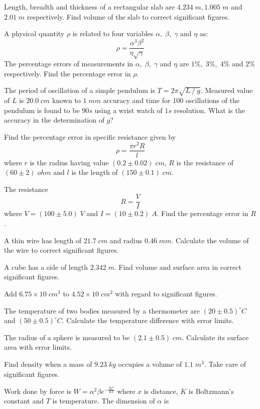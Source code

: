 \documentclass[10pt, a4paper]{exam}
\begin{document}
\begin{multicols*}{2}
\begin{questions}
        \question Length, breadth and thickness of a rectangular slab are $4.234 \; m, 1.005 \; m $ and $ 2.01 \; m$ respectively. Find volume of the slab to correct significant figures.
        
        \question A physical quantity $\rho$ is related to four variables $\alpha, \; \beta, \; \gamma$ and $\eta$ as: \[ \rho = \frac{\alpha^3\beta^2}{\eta\sqrt{\gamma}} \] The percentage errors of measurements in $\alpha, \; \beta, \; \gamma$ and $\eta$ are $1\%,\; 3\%, \;4\%$ and $2\%$ respectively. Find the percentage error in $\rho$.
        
        \question The period of oscillation of a simple pendulum is $T=2\pi\sqrt{L⁄g}$. Measured value of $L$ is $20.0\; cm$ known to $1\; mm$ accuracy and time for 100 oscillations of the pendulum is found to be 90$s$ using a wrist watch of $1s$ resolution. What is the accuracy in the determination of $g$?
        
		\question Find the percentage error in specific resistance given by \[\rho = \frac{\pi r^{2}R}{l}\] where $r$ is the radius having value $(0.2 \pm 0.02) \;cm$, $R$ is the resistance of $(60 \pm 2) \;ohm$ and $l$ is the length of $(150 \pm 0.1)\; cm$.      
		
		\question The resistance \[ R=\frac{V}{I}\] where $V = (100 \pm 5.0) \;V$ and $I = (10 \pm 0.2) \;A$. Find the percentage error in $R$.
		
		\question A thin wire has length of $21.7 \;cm$ and radius $0.46 \;mm$. Calculate the volume of the wire to correct significant figures.
 		
 		\question A cube has a side of length $2.342 \;m$. Find volume and surface area in correct significant figures.
 		
 		\question Add $6.75 \times 10 \;cm^{3}$ to $4.52 \times 10 \;cm^{2}$ with regard to significant figures.
        
        \question The temperature of two bodies measured by a thermometer are $(20 \pm 0.5)^{\circ}C$ and $(50 \pm 0.5)^{\circ}C$. Calculate the temperature difference with error limits.
        
        \question The radius of a sphere is measured to be $(2.1 \pm 0.5) \;cm$. Calculate its surface area with error limits.
        
        \question Find density when a mass of $9.23 \;kg$ occupies a volume of $1.1 \; m^3$. Take care of significant figures.

        \question Work done by force is $W = \alpha^{2}\beta e^{-\frac{\beta x^{2}}{KT}} $ where $x$ is distance, $K$ is Boltzmann's constant and $T$ is temperature. The dimension of $\alpha$ is
        

\end{questions}
\end{multicols*}
\end{document}
